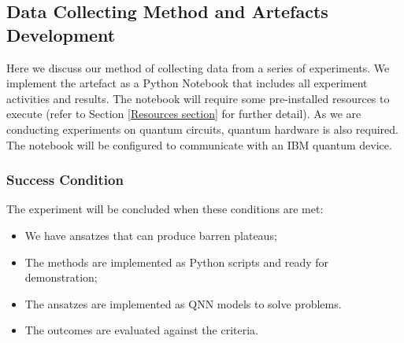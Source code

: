 \subsection{Data Collecting Method and Artefacts Development}
\label{Data Collecting Section}
Here we discuss our method of collecting data from a series of experiments.
We implement the artefact as a Python Notebook that includes all experiment activities and results.
The notebook will require some pre-installed resources to execute (refer to Section \ref{Resources section} for further detail).
As we are conducting experiments on quantum circuits, quantum hardware is also required.
The notebook will be configured to communicate with an IBM quantum device.




\subsubsection{Success Condition}
The experiment will be concluded when these conditions are met:
\begin{itemize}
    \item We have ansatzes that can produce barren plateaus;
    \item The methods are implemented as Python scripts and ready for demonstration;
    \item The ansatzes are implemented as QNN models to solve problems.
    \item The outcomes are evaluated against the criteria.
\end{itemize}